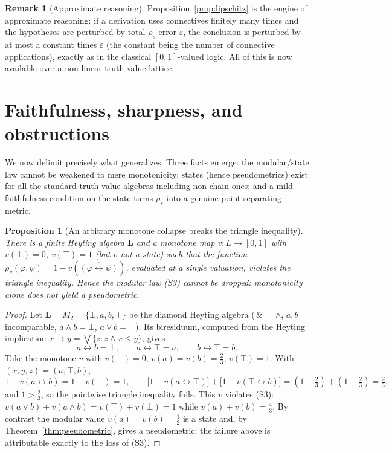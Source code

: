 \documentclass{amsart}
\theoremstyle{definition}
\newtheorem{remark}{Remark}
\theoremstyle{plain}
\newtheorem{proposition}{Proposition}
\newcommand{\bL}{\mathbf{L}}
\newcommand{\fto}{\rightarrow}
\newcommand{\fbi}{\leftrightarrow}
\newcommand{\odotop}{\,\&\,}
\newcommand{\Top}{\top}
\newcommand{\Bot}{\bot}
\begin{document}
\begin{remark}[Approximate reasoning]\label{rem:approx}
Proposition~\ref{prop:lipschitz} is the engine of approximate reasoning: if a
derivation uses connectives finitely many times and the hypotheses are perturbed
by total $\rho_s$-error $\varepsilon$, the conclusion is perturbed by at most a
constant times $\varepsilon$ (the constant being the number of connective
applications), exactly as in the classical $[0,1]$-valued logic.  All of this is
now available over a non-linear truth-value lattice.
\end{remark}

\section{Faithfulness, sharpness, and obstructions}\label{sec:obstr}

We now delimit precisely what generalizes.  Three facts emerge: the
modular/state law cannot be weakened to mere monotonicity; states (hence
pseudometrics) exist for all the standard truth-value algebras including
non-chain ones; and a mild faithfulness condition on the state turns $\rho_s$
into a genuine point-separating metric.

\begin{proposition}[An arbitrary monotone collapse breaks the triangle inequality]
\label{prop:obstr-mono}
There is a finite Heyting algebra $\bL$ and a monotone map $v:L\to[0,1]$ with
$v(\Bot)=0$, $v(\Top)=1$ \emph{(but $v$ not a state)} such that the function
$\rho_v(\varphi,\psi)=1-v(\overline{(\varphi\fbi\psi)})$, evaluated at a single
valuation, violates the triangle inequality.  Hence the modular law (S3) cannot
be dropped: monotonicity alone does not yield a pseudometric.
\end{proposition}

\begin{proof}
Let $\bL=M_2=\{\Bot,a,b,\Top\}$ be the diamond Heyting algebra
($\odotop=\wedge$, $a,b$ incomparable, $a\wedge b=\Bot$, $a\vee b=\Top$).  Its
biresiduum, computed from the Heyting implication
$x\fto y=\bigvee\{z:z\wedge x\le y\}$, gives
\[
a\fbi b=\Bot,\qquad a\fbi\Top=a,\qquad b\fbi\Top=b .
\]
Take the monotone $v$ with $v(\Bot)=0$, $v(a)=v(b)=\tfrac23$, $v(\Top)=1$.  With
$(x,y,z)=(a,\Top,b)$,
\[
1-v(a\fbi b)=1-v(\Bot)=1,\qquad
\bigl[1-v(a\fbi\Top)\bigr]+\bigl[1-v(\Top\fbi b)\bigr]
=(1-\tfrac23)+(1-\tfrac23)=\tfrac23,
\]
and $1>\tfrac23$, so the pointwise triangle inequality fails.  This $v$ violates
(S3): $v(a\vee b)+v(a\wedge b)=v(\Top)+v(\Bot)=1$ while $v(a)+v(b)=\tfrac43$.  By
contrast the modular value $v(a)=v(b)=\tfrac12$ is a state and, by
Theorem~\ref{thm:pseudometric}, gives a pseudometric; the failure above is
attributable exactly to the loss of (S3).
\end{proof}
\end{document}
